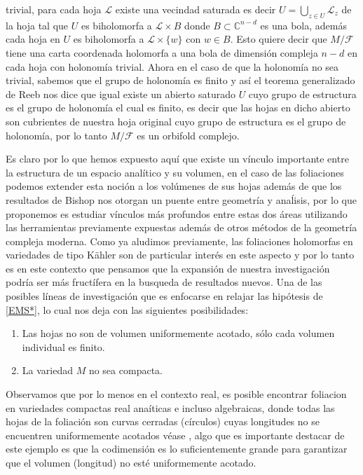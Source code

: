 \documentclass[letterpaper]{report}
\newcommand{\co}{\ensuremath{\mathbb C }}
\begin{document}
trivial, para cada hoja $\mathcal{L}$ existe una vecindad saturada es decir $U=\bigcup_{z\in U}\mathcal{L}_z$ de la hoja tal que $U$ es biholomorfa a $\mathcal{L}\times B$ donde
$B\subset\co^{n-d}$ es una bola, adem\'as cada hoja en $U$ es biholomorfa a $\mathcal{L}\times\{w\}$ con $w\in B$. Esto quiere decir que $M/\mathcal{F}$ tiene una carta coordenada
holomorfa a una bola de dimensi\'on compleja $n-d$ en cada hoja con holonom\'ia trivial. Ahora en el caso de que la holonom\'ia 
no sea trivial, sabemos que el grupo de holonom\'ia es finito y as\'i el teorema generalizado de Reeb \cite{Thurston} nos dice que
igual existe un abierto saturado $U$ cuyo grupo de estructura es el grupo de holonom\'ia el cual es finito, es decir que las hojas
en dicho abierto son cubrientes de nuestra hoja original cuyo grupo de estructura es el grupo de holonom\'ia, por lo tanto
$M/\mathcal{F}$ es un orbifold complejo.

Es claro por lo que hemos expuesto aqu\'i que existe un v\'inculo importante entre la estructura de un espacio anal\'itico y su volumen,
en el caso de las foliaciones podemos extender esta noci\'on a los vol\'umenes de sus hojas adem\'as de que los resultados de Bishop 
nos otorgan un puente entre geometr\'ia y ana\'lisis, por lo que proponemos es estudiar v\'inculos m\'as profundos entre estas
dos \'areas utilizando las herramientas previamente expuestas adem\'as de otros m\'etodos de la geometr\'ia compleja moderna.
Como ya aludimos previamente, las foliaciones holomorfas en variedades de tipo K\"ahler son de particular inter\'es en este aspecto
y por lo tanto es en este contexto que pensamos que la expansi\'on de nuestra investigaci\'on podr\'ia ser m\'as fruct\'ifera en la
busqueda de resultados nuevos. Una de las posibles l\'ineas de investigaci\'on que es enfocarse en relajar las hip\'otesis de 
\ref{EMS*}, lo cual nos deja con las siguientes posibilidades:
\begin{enumerate}
        \item Las hojas no son de volumen uniformemente acotado, s\'olo cada volumen individual es finito.
        \item La variedad $M$ no sea compacta.
\end{enumerate}
Observamos que por lo menos en el contexto real, es posible encontrar foliacion en variedades compactas real ana\'iticas e
incluso algebraicas, donde todas las hojas de la foliaci\'on son curvas cerradas (c\'irculos) cuyas longitudes no se encuentren 
uniformemente acotados v\'ease \cite{E-V}, algo que es importante destacar de este ejemplo es que la codimensi\'on es lo
suficientemente grande para garantizar que el volumen (longitud) no est\'e uniformemente acotado.
\end{document}

